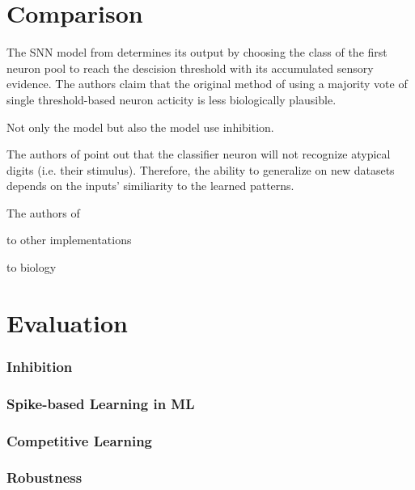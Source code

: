 \section{Comparison}
\label{sec:comparison}

The \ac{SNN} model from \cite{STDP_like} determines its output by 
choosing the class of the first neuron pool to reach the descision threshold with its accumulated sensory evidence.
The authors claim that the original method of using a majority vote of single threshold-based neuron acticity is less biologically plausible.

Not only the \cite{STDP_like} model but also the \cite{SNN} model use inhibition.

The authors of \cite{STDP_like} point out that the classifier neuron will not recognize atypical digits (i.e. their stimulus).
Therefore, the ability to generalize on new datasets depends on the inputs' similiarity to the learned patterns.

The authors of \cite{SNN} 

to other implementations

to biology


\section{Evaluation}
\label{sec:evaluation}

\subsubsection{Inhibition}

\subsubsection{Spike-based Learning in ML}

\subsubsection{Competitive Learning}

\subsubsection{Robustness}